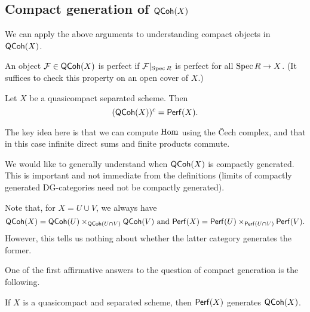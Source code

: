 \documentclass{amsart}
\begin{document}
\subsection{Compact generation of $\mathsf{QCoh}(X)$}

We can apply the above arguments to understanding compact objects in $\mathsf{QCoh}(X)$.

\begin{dfn}
	An object $\mathcal{F} \in \mathsf{QCoh}(X)$ is perfect if $\mathcal{F}|_{\operatorname{Spec} R}$ is perfect for all $\operatorname{Spec} R \to X$.
	(It suffices to check this property on an open cover of $X$.)
\end{dfn}

\begin{cor}
	Let $X$ be a quasicompact separated scheme.
	Then
	\[
		(\mathsf{QCoh}(X))^c = \mathsf{Perf}(X).
	\]
\end{cor}

The key idea here is that we can compute $\operatorname{Hom}$ using the \v{C}ech complex, and that in this case infinite direct sums and finite products commute.

We would like to generally understand when $\mathsf{QCoh}(X)$ is compactly generated.
This is important and not immediate from the definitions (limits of compactly generated DG-categories need not be compactly generated).

Note that, for $X = U \cup V$, we always have
\[
	\mathsf{QCoh}(X) = \mathsf{QCoh}(U) \times_{\mathsf{QCoh}(U \cap V)} \mathsf{QCoh}(V) \textrm{ and } \mathsf{Perf}(X) = \mathsf{Perf}(U) \times_{\mathsf{Perf}(U \cap V)} \mathsf{Perf}(V).
\]
However, this tells us nothing about whether the latter category generates the former.

One of the first affirmative answers to the question of compact generation is the following.

\begin{thm}
	If $X$ is a quasicompact and separated scheme, then $\mathsf{Perf}(X)$ generates $\mathsf{QCoh}(X)$.
\end{thm}
\end{document}

